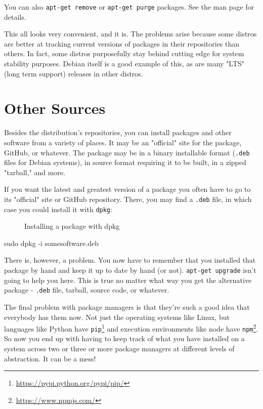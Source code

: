 \documentclass[10pt,american,]{book}
\makeatletter
\newenvironment{Shaded}{\begin{snugshade}}{\end{snugshade}}
\newcommand{\KeywordTok}[1]{\textcolor[rgb]{0.13,0.29,0.53}{\textbf{{#1}}}}
\newcommand{\NormalTok}[1]{{#1}}
\renewcommand{\href}[2]{#2\footnote{\url{#1}}}
\numberwithin{figure}{chapter}
\DeclareRobustCommand{\drcap}[1]{\begin{figure}[H]\caption{#1}\end{figure}}
\DeclareRobustCommand{\drcmd}[1]{\index{Commands!#1@\texttt{#1}}}
\renewcommand{\KeywordTok}[1]{{#1}}
\renewcommand{\NormalTok}[1]{{#1}}
\makeatother
\begin{document}
You can also \texttt{apt-get\ remove} or \texttt{apt-get\ purge}
packages. See the man page for details.

This all looks very convenient, and it is. The problems arise because
some distros are better at tracking current versions of packages in
their repositories than others. In fact, some distros purposefully stay
behind cutting edge for system stability purposes. Debian itself is a
good example of this, as are many "LTS" (long term support) releases in
other distros.

\section*{Other Sources}\label{other-sources}

Besides the distribution's repositories, you can install packages and
other software from a variety of places. It may be an "official" site
for the package, GitHub, or whatever. The package may be in a binary
installable format (\texttt{.deb} files for Debian
systems), in source format requiring it to be built, in a zipped
"tarball," and more.

If you want the latest and greatest version of a package you often have
to go to its "official" site or GitHub repository. There, you may find a
\texttt{.deb} file, in which case you could install it with
\texttt{dpkg}\drcmd{dpkg}:

\drcap{Installing a package with dpkg}

\begin{Shaded}
\begin{Highlighting}[]
\KeywordTok{sudo} \NormalTok{dpkg -i somesoftware.deb}
\end{Highlighting}
\end{Shaded}

There is, however, a problem. You now have to remember that you
installed that package by hand and keep it up to date by hand (or not).
\texttt{apt-get\ upgrade} isn't going to help you here. This is true no
matter what way you get the alternative package - \texttt{.deb} file,
tarball, source code, or whatever.

The final problem with package managers is that they're such a good idea
that everybody has them now. Not just the operating systems like Linux,
but languages like Python have
\href{https://pypi.python.org/pypi/pip/}{\texttt{pip}} and execution
environments like node have \href{https://www.npmjs.com/}{\texttt{npm}}.
So now you end up with having to keep track of what you have installed
on a system across two or three or more package managers at different
levels of abstraction. It can be a mess!
\end{document}
